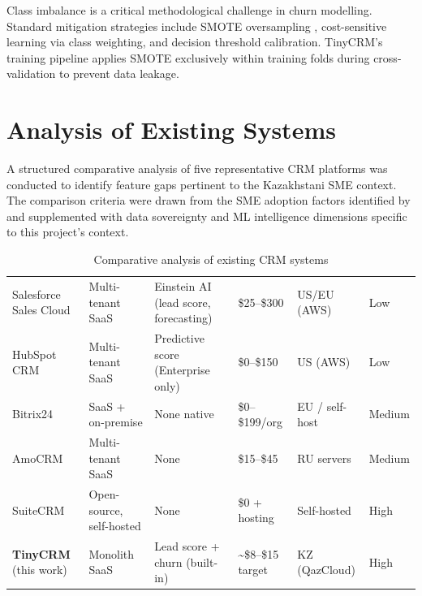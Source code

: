 Class imbalance is a critical methodological challenge in churn modelling.
Standard mitigation strategies include SMOTE oversampling \citep{chawla2002},
cost-sensitive learning via class weighting, and decision threshold
calibration. TinyCRM's training pipeline applies SMOTE exclusively within
training folds during cross-validation to prevent data leakage.

\section{Analysis of Existing Systems}
\label{sec:existing_systems}
\setlength{\parskip}{1em}
%
A structured comparative analysis of five representative CRM platforms was
conducted to identify feature gaps pertinent to the Kazakhstani SME
context. The comparison criteria were drawn from the SME adoption factors
identified by \citet{nguyen2013} and supplemented with data sovereignty and
ML intelligence dimensions specific to this project's context.

\begin{table}[H]
  \centering
  \caption{Comparative analysis of existing CRM systems}
  \label{tab:crm_comparison}
  \begin{tabularx}{\textwidth}{@{}L{2.4cm} L{2.2cm} L{2.2cm} L{2.4cm} L{2.4cm} L{2.4cm}@{}}
    \toprule
     &  &  &
     &  &
     \\
    \midrule
    Salesforce Sales Cloud &
      Multi-tenant SaaS & Einstein AI (lead score, forecasting) &
      \$25--\$300 & US/EU (AWS) & Low \\[4pt]
    HubSpot CRM &
      Multi-tenant SaaS & Predictive score (Enterprise only) &
      \$0--\$150 & US (AWS) & Low \\[4pt]
    Bitrix24 &
      SaaS + on-premise & None native &
      \$0--\$199/org & EU / self-host & Medium \\[4pt]
    AmoCRM &
      Multi-tenant SaaS & None &
      \$15--\$45 & RU servers & Medium \\[4pt]
    SuiteCRM &
      Open-source, self-hosted & None &
      \$0 + hosting & Self-hosted & High \\[4pt]
    \textbf{TinyCRM} (this work) &
      Monolith SaaS & Lead score + churn (built-in) &
      \textasciitilde\$8--\$15 target & KZ (QazCloud) & High \\
    \bottomrule
  \end{tabularx}
\end{table}

